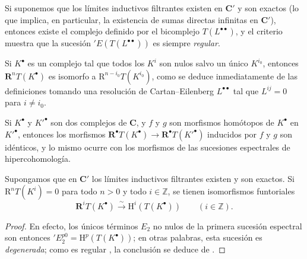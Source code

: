\begin{env}[11.4.3]
Si suponemos que los límites inductivos filtrantes existen en $\boldsymbol{C}'$ y son exactos (lo que implica, en particular, la existencia de sumas directas infinitas en $\boldsymbol{C}'$), entonces existe el complejo definido por el bicomplejo $T(L^{\bullet\bullet})$, y el criterio  muestra que la sucesión $'E(T(L^{\bullet\bullet}))$ es siempre \emph{regular}.

Si $K^\bullet$ es un complejo tal que todos los $K^i$ son nulos salvo un único $K^{i_0}$, entonces
$\mathbf R^nT(K^\bullet)$ es isomorfo a $\mathrm R^{n-i_0}T(K^{i_0})$, como se deduce inmediatamente de las definiciones tomando una resolución de Cartan--Eilenberg $L^{\bullet\bullet}$ tal que $L^{ij}=0$ para $i\neq i_0$.

Si $K^\bullet$ y $K'^\bullet$ son dos complejos de $\boldsymbol{C}$, y $f$ y $g$ son morfismos homótopos de $K^\bullet$ en $K'^\bullet$, entonces los morfismos $\mathbf R^\bullet T(K^\bullet)\to
\mathbf R^\bullet T(K'^\bullet)$ inducidos por $f$ y $g$ son idénticos, y lo mismo ocurre con los morfismos de las sucesiones espectrales de hipercohomología.
\end{env}

\begin{proposition}[11.4.5]
\label{0.11.4.5-fr}
Supongamos que en $\boldsymbol{C}'$ los límites inductivos filtrantes existen y son exactos. Si $\mathrm R^nT(K^i)=0$ para todo $n>0$ y todo $i\in\mathbb Z$, se tienen isomorfismos funtoriales
\[
  \label{0.11.4.5.1-fr}
  \mathbf R^iT(K^\bullet)\xrightarrow{\sim}
  \mathrm H^i(T(K^\bullet))\qquad(i\in\mathbb Z).
  \tag{11.4.5.1}
\]
\end{proposition}

\begin{proof}
En efecto, los únicos términos $E_2$ no nulos de la primera sucesión espectral  son entonces $'E_2^{p0}=\mathrm H^p(T(K^\bullet))$;
en otras palabras, esta sucesión es \emph{degenerada};
como es regular , la conclusión se deduce de .
\end{proof}

